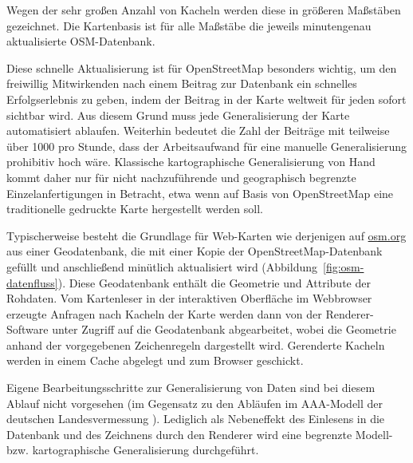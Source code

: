 \documentclass[../main/thesis.tex]{subfiles}
\begin{document}
Wegen der sehr großen Anzahl von Kacheln werden diese in größeren Maßstäben  gezeichnet. 
Die Kartenbasis ist für alle Maßstäbe die jeweils minutengenau aktualisierte OSM-Datenbank.

Diese schnelle Aktualisierung ist für OpenStreetMap besonders wichtig, um den freiwillig Mitwirkenden nach einem Beitrag zur Datenbank ein schnelles Erfolgserlebnis zu geben, indem der Beitrag in der Karte weltweit für jeden sofort sichtbar wird.
Aus diesem Grund muss jede Generalisierung der Karte automatisiert ablaufen.
Weiterhin bedeutet die Zahl der Beiträge mit teilweise über 1000  pro Stunde, 
dass der Arbeitsaufwand für eine manuelle Generalisierung prohibitiv hoch wäre.
Klassische kartographische Generalisierung von Hand kommt daher nur für nicht nachzuführende und geographisch begrenzte Einzelanfertigungen in Betracht, etwa wenn auf Basis von OpenStreetMap eine traditionelle gedruckte Karte hergestellt werden soll.

Typischerweise besteht die Grundlage für Web-Karten wie derjenigen auf \url{osm.org} aus einer Geodatenbank, die mit einer Kopie der OpenStreetMap-Datenbank gefüllt und anschließend minütlich aktualisiert wird (Abbildung~\ref{fig:osm-datenfluss}).
Diese Geodatenbank enthält die Geometrie und Attribute  der Rohdaten.
Vom Kartenleser in der interaktiven Oberfläche im Webbrowser erzeugte Anfragen nach Kacheln der Karte werden dann von der Renderer-Software unter Zugriff auf die Geodatenbank abgearbeitet, wobei die Geometrie anhand der vorgegebenen Zeichenregeln dargestellt wird.
Gerenderte Kacheln werden in einem Cache abgelegt und zum Browser geschickt.

Eigene Bearbeitungsschritte zur Generalisierung von Daten sind bei diesem Ablauf nicht vorgesehen (im Gegensatz zu den Abläufen im AAA-Modell der deutschen Landesvermessung  ).
Lediglich als Nebeneffekt des Einlesens in die Datenbank und des Zeichnens durch den Renderer wird eine begrenzte Modell- bzw. kartographische Generalisierung durchgeführt. 

\end{document}
